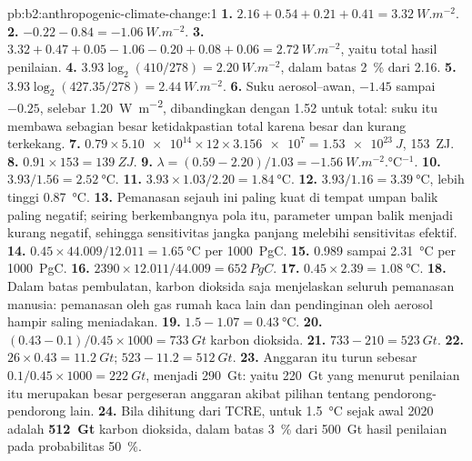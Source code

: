 \begin{solution}{pb:b2:anthropogenic-climate-change:1}
\textbf{1.} $2.16 + 0.54 + 0.21 + 0.41 = \qty{3.32}{W.m^{-2}}$.
\textbf{2.} $-0.22 - 0.84 = \qty{-1.06}{W.m^{-2}}$.
\textbf{3.} $3.32 + 0.47 + 0.05 - 1.06 - 0.20 + 0.08 + 0.06 = \qty{2.72}{W.m^{-2}}$, yaitu total
hasil penilaian.
\textbf{4.} $3.93\log_2(410/278) = \qty{2.20}{W.m^{-2}}$, dalam batas \qty{2}{\percent} dari 2.16.
\textbf{5.} $3.93\log_2(427.35/278) = \qty{2.44}{W.m^{-2}}$.
\textbf{6.} Suku aerosol--awan, $-1.45$ sampai $-0.25$, selebar \qty{1.20}{W.m^{-2}}, dibandingkan dengan 1.52 untuk
total: suku itu membawa sebagian besar ketidakpastian total karena besar dan kurang
terkekang.
\textbf{7.} $0.79 \times \num{5.10e14} \times 12 \times \num{3.156e7} = \qty{1.53e23}{J}$,
\qty{153}{ZJ}.
\textbf{8.} $0.91 \times 153 = \qty{139}{ZJ}$.
\textbf{9.} $\lambda = (0.59 - 2.20)/1.03 = \qty{-1.56}{W.m^{-2}.\celsius^{-1}}$.
\textbf{10.} $3.93/1.56 = \qty{2.52}{\celsius}$.
\textbf{11.} $3.93 \times 1.03/2.20 = \qty{1.84}{\celsius}$.
\textbf{12.} $3.93/1.16 = \qty{3.39}{\celsius}$, lebih tinggi \qty{0.87}{\celsius}.
\textbf{13.} Pemanasan sejauh ini paling kuat di tempat umpan balik paling negatif; seiring berkembangnya
pola itu, parameter umpan balik menjadi kurang negatif, sehingga sensitivitas jangka panjang
melebihi sensitivitas efektif.
\textbf{14.} $0.45 \times 44.009/12.011 = \qty{1.65}{\celsius}$ per \qty{1000}{PgC}.
\textbf{15.} 0.989 sampai \qty{2.31}{\celsius} per \qty{1000}{PgC}.
\textbf{16.} $2390 \times 12.011/44.009 = \qty{652}{PgC}$.
\textbf{17.} $0.45 \times 2.39 = \qty{1.08}{\celsius}$.
\textbf{18.} Dalam batas pembulatan, karbon dioksida saja menjelaskan seluruh pemanasan manusia:
pemanasan oleh gas rumah kaca lain dan pendinginan oleh aerosol hampir saling meniadakan.
\textbf{19.} $1.5 - 1.07 = \qty{0.43}{\celsius}$.
\textbf{20.} $(0.43 - 0.1)/0.45 \times 1000 = \qty{733}{Gt}$ karbon dioksida.
\textbf{21.} $733 - 210 = \qty{523}{Gt}$.
\textbf{22.} $26 \times 0.43 = \qty{11.2}{Gt}$; $523 - 11.2 = \qty{512}{Gt}$.
\textbf{23.} Anggaran itu turun sebesar $0.1/0.45 \times 1000 = \qty{222}{Gt}$, menjadi \qty{290}{Gt}: yaitu
\qty{220}{Gt} yang menurut penilaian itu merupakan besar pergeseran anggaran akibat pilihan tentang pendorong-pendorong lain.
\textbf{24.} Bila dihitung dari TCRE,  untuk \qty{1.5}{\celsius} sejak
awal 2020 adalah \textbf{\qty[text-series-to-math=true]{512}{Gt}} karbon dioksida, dalam batas
\qty{3}{\percent} dari \qty{500}{Gt} hasil penilaian pada probabilitas \qty{50}{\percent}.
\end{solution}
